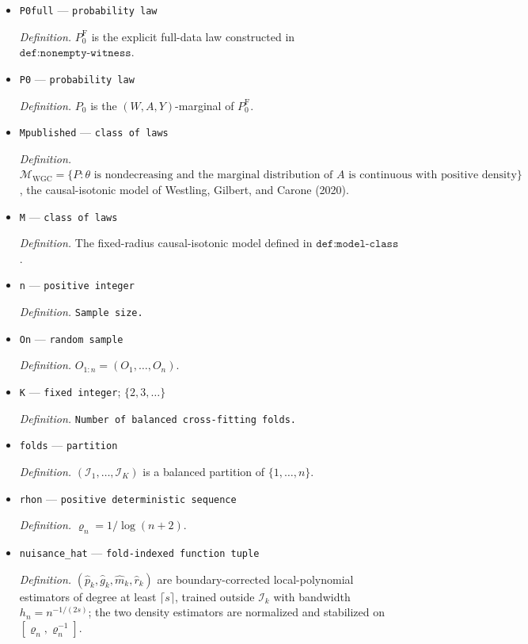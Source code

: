 \documentclass{article}
\begin{document}
\begin{itemize}
  \item \texttt{P0full} --- \texttt{probability law}
  \par\smallskip\noindent\emph{Definition.} \(P_0^{\mathrm F}\) is the explicit full-data law constructed in \(\texttt{def:nonempty-witness}\).
  \item \texttt{P0} --- \texttt{probability law}
  \par\smallskip\noindent\emph{Definition.} \(P_0\) is the \((W,A,Y)\)-marginal of \(P_0^{\mathrm F}\).
  \item \texttt{Mpublished} --- \texttt{class of laws}
  \par\smallskip\noindent\emph{Definition.} \(\mathcal M_{\mathrm{WGC}}=\{P:\theta\text{ is nondecreasing and the marginal distribution of }A\text{ is continuous with positive density}\}\), the causal-isotonic model of Westling, Gilbert, and Carone (2020).
  \item \texttt{M} --- \texttt{class of laws}
  \par\smallskip\noindent\emph{Definition.} The fixed-radius causal-isotonic model defined in \(\texttt{def:model-class}\).
  \item \texttt{n} --- \texttt{positive integer}
  \par\smallskip\noindent\emph{Definition.} \texttt{Sample size.}
  \item \texttt{On} --- \texttt{random sample}
  \par\smallskip\noindent\emph{Definition.} \(O_{1:n}=(O_{1},\ldots,O_{n})\).
  \item \texttt{K} --- \texttt{fixed integer}; \(\{2,3,\ldots\}\)
  \par\smallskip\noindent\emph{Definition.} \texttt{Number of balanced cross-\allowbreak{}fitting folds.}
  \item \texttt{folds} --- \texttt{partition}
  \par\smallskip\noindent\emph{Definition.} \((\mathcal I_{1},\ldots,\mathcal I_{K})\) is a balanced partition of \(\{1,\ldots,n\}\).
  \item \texttt{rhon} --- \texttt{positive deterministic sequence}
  \par\smallskip\noindent\emph{Definition.} \(\varrho_n=1/\log(n+2)\).
  \item \texttt{nuisance\_\allowbreak{}hat} --- \texttt{fold-\allowbreak{}indexed function tuple}
  \par\smallskip\noindent\emph{Definition.} \((\widehat p_{k},\widehat g_{k},\widehat m_{k},\widehat r_{k})\) are boundary-corrected local-polynomial estimators of degree at least \(\lceil s\rceil\), trained outside \(\mathcal I_{k}\) with bandwidth \(h_{n}=n^{-1/(2s)}\); the two density estimators are normalized and stabilized on \([\varrho_n,\varrho_n^{-1}]\).

\end{itemize}
\end{document}
